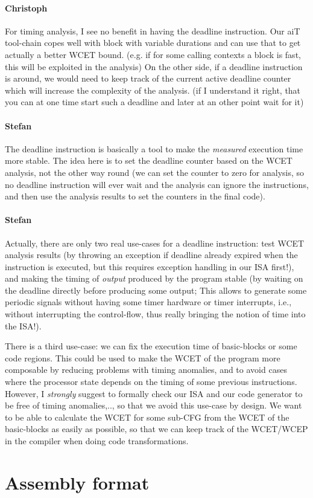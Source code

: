 \documentclass{IEEEtran}
\newcommand{\comment}[3]{\paragraph*{\textbf{#1}}{\color{#3}#2}}
\newcommand{\stefan}[1]{\comment{Stefan}{#1}{RoyalPurple}}
\newcommand{\cullmann}[1]{\comment{Christoph}{#1}{Maroon}}
\begin{document}
\cullmann{For timing analysis, I see no benefit in having the deadline instruction.
Our aiT tool-chain copes well with block with variable durations and can use that to get actually a better WCET bound. (e.g. if for some calling contexts a block is fast, this will be exploited in the analysis)
On the other side, if a deadline instruction is around, we would need to keep track of the current active deadline counter which will increase the complexity of the analysis.
(if I understand it right, that you can at one time start such a deadline and later at an other point wait for it)
}
\stefan{The deadline instruction is basically a tool to make the \emph{measured} execution time more stable. The idea here is to set the
deadline counter based on the WCET analysis, not the other way round (we can set the counter to zero for analysis, so no deadline
instruction will ever wait and the analysis can ignore the instructions, and then use the analysis results to set the counters in the final
code).}
\stefan{Actually, there are only two real use-cases for a deadline instruction: test WCET analysis results (by throwing an exception if
deadline already expired when the instruction is executed, but this requires exception handling in our ISA first!), and making the timing of
\emph{output} produced by the program stable (by waiting on the deadline directly before producing some output; This allows to generate some
periodic signals without having some timer hardware or timer interrupts, i.e., without interrupting the control-flow, thus really bringing
the notion of time into the ISA!).

There is a third use-case: we can fix the execution time of basic-blocks or some code regions. This could be used to make the WCET
of the program more composable by reducing problems with timing anomalies, and to avoid cases where the processor state depends on
the timing of some previous instructions. However, I \emph{strongly} suggest to formally check our ISA and our code generator to be
free of timing anomalies,.., so that we avoid this use-case by design. We want to be able to calculate the WCET for some sub-CFG from the
WCET of the basic-blocks as easily as possible, so that we can keep track of the WCET/WCEP in the compiler when doing code
transformations.}



\section{Assembly format}
\end{document}
